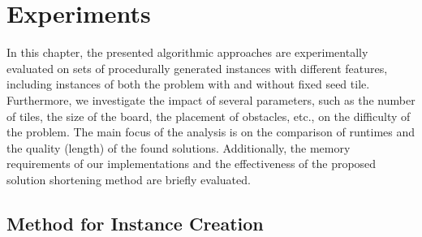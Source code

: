 \chapter{Experiments}
In this chapter, the presented algorithmic approaches are experimentally evaluated on sets of procedurally generated instances with different features, including instances of both the problem with and without fixed seed tile. Furthermore, we investigate the impact of several parameters, such as the number of tiles, the size of the board, the placement of obstacles, etc., on the difficulty of the problem. The main focus of the analysis is on the comparison of runtimes and the quality (length) of the found solutions. Additionally, the memory requirements of our implementations and the effectiveness of the proposed solution shortening method are briefly evaluated.

\section{Method for Instance Creation}

